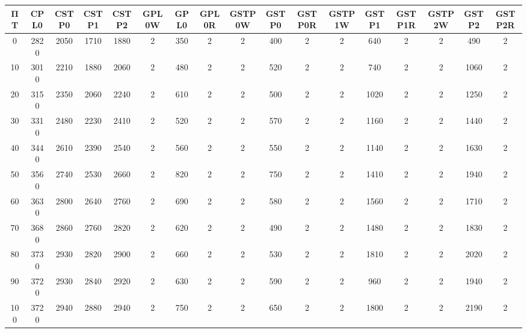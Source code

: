 \begin{tabular}{|c|c|c|c|c|c|c|c|c|c|c|c|c|c|c|c|c|}
\hline
ΠΤ&CPL0&CSTP0&CSTP1&CSTP2&GPL0W&GPL0&GPL0R&GSTP0W&GSTP0&GSTP0R&GSTP1W&GSTP1&GSTP1R&GSTP2W&GSTP2&GSTP2R\\\hline
\hline
0&2820&2050&1710&1880&2&350&2&2&400&2&2&640&2&2&490&2\\
\hline
10&3010&2210&1880&2060&2&480&2&2&520&2&2&740&2&2&1060&2\\
\hline
20&3150&2350&2060&2240&2&610&2&2&500&2&2&1020&2&2&1250&2\\
\hline
30&3310&2480&2230&2410&2&520&2&2&570&2&2&1160&2&2&1440&2\\
\hline
40&3440&2610&2390&2540&2&560&2&2&550&2&2&1140&2&2&1630&2\\
\hline
50&3560&2740&2530&2660&2&820&2&2&750&2&2&1410&2&2&1940&2\\
\hline
60&3630&2800&2640&2760&2&690&2&2&580&2&2&1560&2&2&1710&2\\
\hline
70&3680&2860&2760&2820&2&620&2&2&490&2&2&1480&2&2&1830&2\\
\hline
80&3730&2930&2820&2900&2&660&2&2&530&2&2&1810&2&2&2020&2\\
\hline
90&3720&2930&2840&2920&2&630&2&2&590&2&2&960&2&2&1940&2\\
\hline
100&3720&2940&2880&2940&2&750&2&2&650&2&2&1800&2&2&2190&2\\
\hline
\end{tabular}
